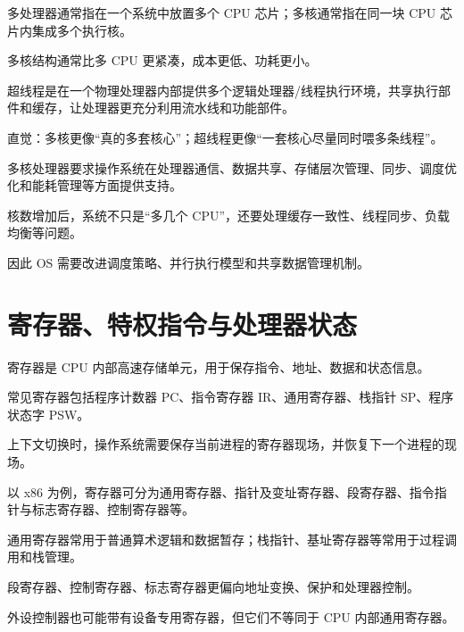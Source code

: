 \begin{points}
  \item 多处理器通常指在一个系统中放置多个 CPU 芯片；多核通常指在同一块 CPU 芯片内集成多个执行核。
  \item 多核结构通常比多 CPU 更紧凑，成本更低、功耗更小。
  \item 超线程是在一个物理处理器内部提供多个逻辑处理器/线程执行环境，共享执行部件和缓存，让处理器更充分利用流水线和功能部件。
  \item 直觉：多核更像“真的多套核心”；超线程更像“一套核心尽量同时喂多条线程”。
\end{points}


\begin{points}
  \item 多核处理器要求操作系统在处理器通信、数据共享、存储层次管理、同步、调度优化和能耗管理等方面提供支持。
  \item 核数增加后，系统不只是“多几个 CPU”，还要处理缓存一致性、线程同步、负载均衡等问题。
  \item 因此 OS 需要改进调度策略、并行执行模型和共享数据管理机制。
\end{points}


\section{寄存器、特权指令与处理器状态}
\begin{points}
  \item 寄存器是 CPU 内部高速存储单元，用于保存指令、地址、数据和状态信息。
  \item 常见寄存器包括程序计数器 PC、指令寄存器 IR、通用寄存器、栈指针 SP、程序状态字 PSW。
  \item 上下文切换时，操作系统需要保存当前进程的寄存器现场，并恢复下一个进程的现场。
\end{points}


\begin{points}
  \item 以 x86 为例，寄存器可分为通用寄存器、指针及变址寄存器、段寄存器、指令指针与标志寄存器、控制寄存器等。
  \item 通用寄存器常用于普通算术逻辑和数据暂存；栈指针、基址寄存器等常用于过程调用和栈管理。
  \item 段寄存器、控制寄存器、标志寄存器更偏向地址变换、保护和处理器控制。
  \item 外设控制器也可能带有设备专用寄存器，但它们不等同于 CPU 内部通用寄存器。
\end{points}



